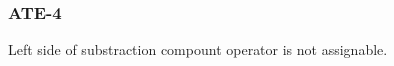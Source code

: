 \subsubsection{ATE-4}\label{sec:error_code_ate_4}

Left side of substraction compount operator is not assignable.


